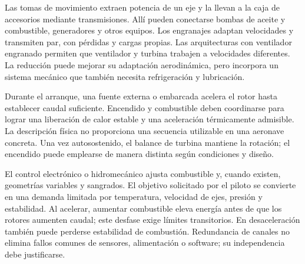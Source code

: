 Las tomas de movimiento extraen potencia de un eje y la llevan a la caja de accesorios mediante transmisiones. Allí pueden conectarse bombas de aceite y combustible, generadores y otros equipos. Los engranajes adaptan velocidades y transmiten par, con pérdidas y cargas propias. Las arquitecturas con ventilador engranado permiten que ventilador y turbina trabajen a velocidades diferentes. La reducción puede mejorar su adaptación aerodinámica, pero incorpora un sistema mecánico que también necesita refrigeración y lubricación.

Durante el arranque, una fuente externa o embarcada acelera el rotor hasta establecer caudal suficiente. Encendido y combustible deben coordinarse para lograr una liberación de calor estable y una aceleración térmicamente admisible. La descripción física no proporciona una secuencia utilizable en una aeronave concreta. Una vez autosostenido, el balance de turbina mantiene la rotación; el encendido puede emplearse de manera distinta según condiciones y diseño.

El control electrónico o hidromecánico ajusta combustible y, cuando existen, geometrías variables y sangrados. El objetivo solicitado por el piloto se convierte en una demanda limitada por temperatura, velocidad de ejes, presión y estabilidad. Al acelerar, aumentar combustible eleva energía antes de que los rotores aumenten caudal; este desfase exige límites transitorios. En desaceleración también puede perderse estabilidad de combustión. Redundancia de canales no elimina fallos comunes de sensores, alimentación o software; su independencia debe justificarse.

